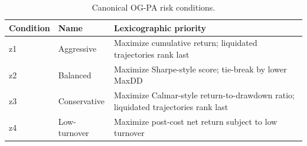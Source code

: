 \begin{table}[t]
\centering
\caption{Canonical OG-PA risk conditions.}
\label{tab:table_32_ogpa_risk_conditions}
\begin{tabular}{lll}
\toprule
Condition & Name & Lexicographic priority \\
\midrule
z1 & Aggressive & Maximize cumulative return; liquidated trajectories rank last \\
z2 & Balanced & Maximize Sharpe-style score; tie-break by lower MaxDD \\
z3 & Conservative & Maximize Calmar-style return-to-drawdown ratio; liquidated trajectories rank last \\
z4 & Low-turnover & Maximize post-cost net return subject to low turnover \\
\bottomrule
\end{tabular}
\end{table}
